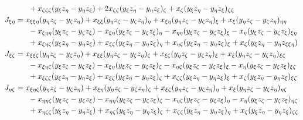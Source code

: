 \documentclass{article}
\begin{document}
\begin{subequations}
\begin{align}
			&\hspace{6mm}+x_{\zeta\zeta\zeta}(y_{\xi}z_{\eta}-y_{\eta}z_{\xi})+2x_{\zeta\zeta}(y_{\xi}z_{\eta}-y_{\eta}z_{\xi})_{\zeta}+x_{\zeta}(y_{\xi}z_{\eta}-y_{\eta}z_{\xi})_{\zeta\zeta} \\
J_{\xi\eta}		&= x_{\xi\xi\eta}(y_{\eta}z_{\zeta}-y_{\zeta}z_{\eta})+x_{\xi\xi}(y_{\eta}z_{\zeta}-y_{\zeta}z_{\eta})_{\eta}+x_{\xi\eta}(y_{\eta}z_{\zeta}-y_{\zeta}z_{\eta})_{\xi}+x_{\xi}(y_{\eta}z_{\zeta}-y_{\zeta}z_{\eta})_{\eta\eta} \notag \\
			&\hspace{6mm}-x_{\xi\eta\eta}(y_{\xi}z_{\zeta}-y_{\zeta}z_{\xi})-x_{\xi\eta}(y_{\xi}z_{\zeta}-y_{\zeta}z_{\xi})_{\eta}-x_{\eta\eta}(y_{\xi}z_{\zeta}-y_{\zeta}z_{\xi})_{\xi}-x_{\eta}(y_{\xi}z_{\zeta}-y_{\zeta}z_{\xi})_{\xi\eta} \notag \\
			&\hspace{6mm}+x_{\xi\eta\zeta}(y_{\xi}z_{\eta}-y_{\eta}z_{\xi})+x_{\xi\zeta}(y_{\xi}z_{\eta}-y_{\eta}z_{\xi})_{\eta}+x_{\eta\zeta}(y_{\xi}z_{\eta}-y_{\eta}z_{\xi})_{\xi}+x_{\zeta}(y_{\xi}z_{\eta}-y_{\eta}z_{\xi\xi\eta}) \\
J_{\xi\zeta}		&= x_{\xi\xi\zeta}(y_{\eta}z_{\zeta}-y_{\zeta}z_{\eta})+x_{\xi\xi}(y_{\eta}z_{\zeta}-y_{\zeta}z_{\eta})_{\zeta}+x_{\xi\zeta}(y_{\eta}z_{\zeta}-y_{\zeta}z_{\eta})_{\xi}+x_{\xi}(y_{\eta}z_{\zeta}-y_{\zeta}z_{\eta})_{\xi\zeta} \notag \\
			&\hspace{6mm}-x_{\xi\eta\zeta}(y_{\xi}z_{\zeta}-y_{\zeta}z_{\xi})-x_{\xi\eta}(y_{\xi}z_{\zeta}-y_{\zeta}z_{\xi})_{\zeta}-x_{\eta\zeta}(y_{\xi}z_{\zeta}-y_{\zeta}z_{\xi})_{\xi}-x_{\eta}(y_{\xi}z_{\zeta}-y_{\zeta}z_{\xi})_{\xi\zeta} \notag \\
			&\hspace{6mm}+x_{\xi\zeta\zeta}(y_{\xi}z_{\eta}-y_{\eta}z_{\xi})+x_{\xi\zeta}(y_{\xi}z_{\eta}-y_{\eta}z_{\xi})_{\zeta}+x_{\zeta\zeta}(y_{\xi}z_{\eta}-y_{\eta}z_{\xi})_{\xi}+x_{\zeta}(y_{\xi}z_{\eta}-y_{\eta}z_{\xi})_{\xi\zeta} \\
J_{\eta\zeta}	& = x_{\xi\eta\zeta}(y_{\eta}z_{\zeta}-y_{\zeta}z_{\eta})+x_{\xi\eta}(y_{\eta}z_{\zeta}-y_{\zeta}z_{\eta})_{\zeta}+x_{\xi\zeta}(y_{\eta}z_{\zeta}-y_{\zeta}z_{\eta})_{\eta}+x_{\xi}(y_{\eta}z_{\zeta}-y_{\zeta}z_{\eta})_{\eta\zeta} \notag \\
			&\hspace{6mm}-x_{\eta\eta\zeta}(y_{\xi}z_{\zeta}-y_{\zeta}z_{\xi})-x_{\eta\eta}(y_{\xi}z_{\zeta}-y_{\zeta}z_{\xi})_{\zeta}-x_{\eta\zeta}(y_{\xi}z_{\zeta}-y_{\zeta}z_{\xi})_{\eta}-x_{\eta}(y_{\xi}z_{\zeta}-y_{\zeta}z_{\xi})_{\eta\zeta} \notag \\
			&\hspace{6mm}+x_{\eta\zeta\zeta}(y_{\xi}z_{\eta}-y_{\eta}z_{\xi})+x_{\eta\zeta}(y_{\xi}z_{\eta}-y_{\eta}z_{\xi})_{\zeta}+x_{\zeta\zeta}(y_{\xi}z_{\eta}-y_{\eta}z_{\xi})_{\eta}+x_{\zeta}(y_{\xi}z_{\eta}-y_{\eta}z_{\xi})_{\zeta\zeta}
\end{align}
\end{subequations}
\clearpage\noindent
\end{document}
